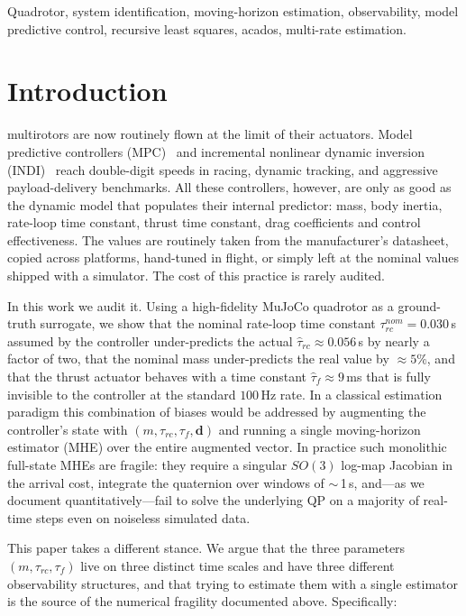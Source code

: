 \documentclass[lettersize,journal]{IEEEtran}
\newcommand{\SOg}{SO(3)}
\newcommand{\vect}[1]{\bm{#1}}
\begin{document}
\begin{IEEEkeywords}
Quadrotor, system identification, moving-horizon estimation,
observability, model predictive control, recursive least squares,
acados, multi-rate estimation.
\end{IEEEkeywords}

\section{Introduction}

 multirotors are now routinely flown at the
limit of their actuators.  Model predictive controllers
(MPC)~\cite{hanover2024autonomous,romero2022model,foehn2021time}
and incremental nonlinear dynamic inversion
(INDI)~\cite{smeur2016adaptive,sun2022comparative} reach
double-digit speeds in racing, dynamic tracking, and aggressive
payload-delivery benchmarks.  All these controllers, however, are
only as good as the dynamic model that populates their internal
predictor: mass, body inertia, rate-loop time constant, thrust
time constant, drag coefficients and control effectiveness.  The
values are routinely taken from the manufacturer's datasheet,
copied across platforms, hand-tuned in flight, or simply left at
the nominal values shipped with a simulator.  The cost of this
practice is rarely audited.

In this work we audit it.  Using a high-fidelity MuJoCo quadrotor
as a ground-truth surrogate, we show that the nominal rate-loop
time constant $\tau_{rc}^{nom}=0.030$\,s assumed by the controller
under-predicts the actual $\hat\tau_{rc}\approx 0.056$\,s by
nearly a factor of two, that the nominal mass under-predicts the
real value by $\approx 5\%$, and that the thrust actuator
behaves with a time constant $\hat\tau_f\approx 9$\,ms that is
fully invisible to the controller at the standard $100$\,Hz rate.
In a classical estimation paradigm this combination of biases
would be addressed by augmenting the controller's state with
$(m,\tau_{rc},\tau_f,\vect d)$ and running a single moving-horizon
estimator (MHE) over the entire augmented vector.  In practice
such monolithic full-state MHEs are fragile: they require a
singular $\SOg$ log-map Jacobian in the arrival cost, integrate
the quaternion over windows of $\sim$\,1\,s, and---as we document
quantitatively---fail to solve the underlying QP on a majority of
real-time steps even on noiseless simulated data.

This paper takes a different stance.  We argue that the three
parameters $(m,\tau_{rc},\tau_f)$ live on three distinct time
scales and have three different observability structures, and
that trying to estimate them with a single estimator is the
source of the numerical fragility documented above.  Specifically:
\end{document}
